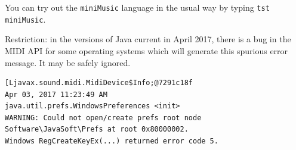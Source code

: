 You can try out the {\tt miniMusic} language in the usual way by typing {\tt tst miniMusic}.\\[2ex]

\noindent\begin{boxedminipage}{\textwidth}
Restriction: in the versions of Java current in April 2017, there is a bug in the MIDI API for some operating systems which will generate this spurious error message. It may be safely ignored.
\begin{verbatim}
[Ljavax.sound.midi.MidiDevice$Info;@7291c18f
Apr 03, 2017 11:23:49 AM 
java.util.prefs.WindowsPreferences <init>
WARNING: Could not open/create prefs root node 
Software\JavaSoft\Prefs at root 0x80000002. 
Windows RegCreateKeyEx(...) returned error code 5.
\end{verbatim}
\end{boxedminipage}

